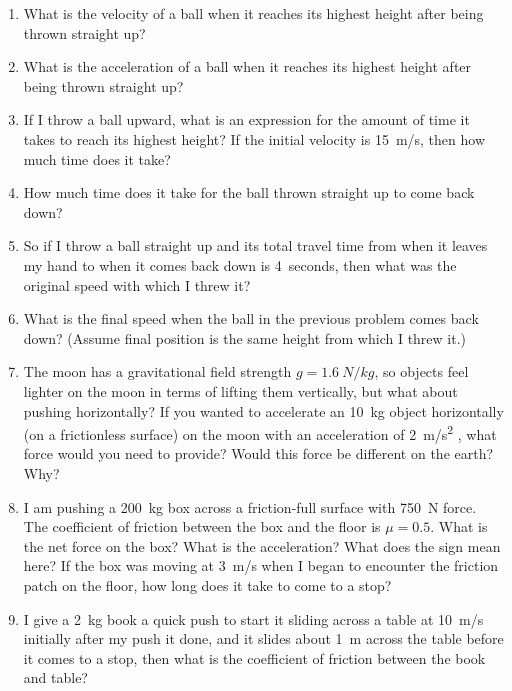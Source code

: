 \begin{enumerate}
\item What is the velocity of a ball when it reaches its highest height after being thrown straight up?
\item What is the acceleration of a ball when it reaches its highest height after being thrown straight up?
\item If I throw a ball upward, what is an expression for the amount of time it takes to reach its highest height? If the initial velocity is \SI{15}{m/s}, then how much time does it take? 
\item How much time does it take for the ball thrown straight up to come back down?
\item So if I throw a ball straight up and its total travel time from when it leaves my hand to when it comes back down is \SI{4}{seconds}, then what was the original speed with which I threw it?
\item What is the final speed when the ball in the previous problem comes back down? (Assume final position is the same height from which I threw it.)




\item The moon has a gravitational field strength $g=\SI{1.6}{N/kg}$, so objects feel lighter on the moon in terms of lifting them vertically, but what about pushing horizontally? If you wanted to accelerate an \SI{10}{kg} object horizontally (on a frictionless surface) on the moon with an acceleration of \SI{2}{\meter/\second^2} , what force would you need to provide? Would this force be different on the earth? Why?

\item I am pushing a \SI{200}{\kilogram} box across a friction-full surface with \SI{750}{\newton} force. The coefficient of friction between the box and the floor is $\mu=0.5$. What is the net force on the box? What is the acceleration? What does the sign mean here? If the box was moving at \SI{3}{m/s} when I began to encounter the friction patch on the floor, how long does it take to come to a stop?\bigskip

\item I give a \SI{2}{kg} book a quick push to start it sliding across a table at \SI{10}{m/s} initially after my push it done, and it slides about \SI{1}{m} across the table before it comes to a stop, then what is the coefficient of friction between the book and table?\bigskip





\end{enumerate}